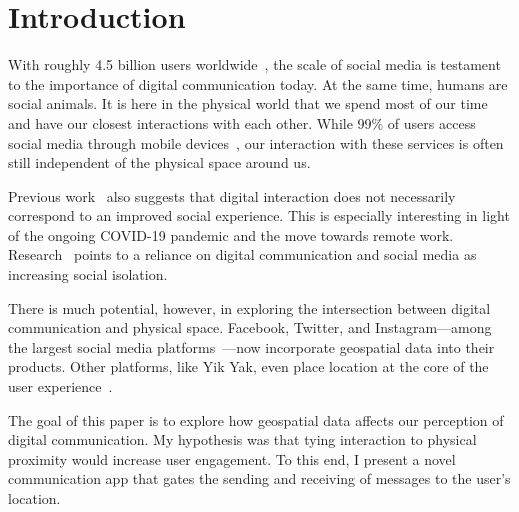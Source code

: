 \section{Introduction}

With roughly 4.5 billion users worldwide~\cite{umaine_2021}, the scale of social media is testament to the importance of digital communication today. At the same time, humans are social animals. It is here in the physical world that we spend most of our time and have our closest interactions with each other. While 99\% of users access social media through mobile devices~\cite{umaine_2021}, our interaction with these services is often still independent of the physical space around us.

Previous work~\cite{ducheneaut_2006} also suggests that digital interaction does not necessarily correspond to an improved social experience. This is especially interesting in light of the ongoing \textsc{COVID-19} pandemic and the move towards remote work. Research~\cite{bonsaksen_2021,mann_2003} points to a reliance on digital communication and social media as increasing social isolation.

There is much potential, however, in exploring the intersection between digital communication and physical space. Facebook, Twitter, and Instagram—among the largest social media platforms~\cite{umaine_2021}—now incorporate geospatial data into their products. Other platforms, like Yik Yak, even place location at the core of the user experience~\cite{yikyak_2015}.

The goal of this paper is to explore how geospatial data affects our perception of digital communication. My hypothesis was that tying interaction to physical proximity would increase user engagement. To this end, I present a novel communication app that gates the sending and receiving of messages to the user's location.
